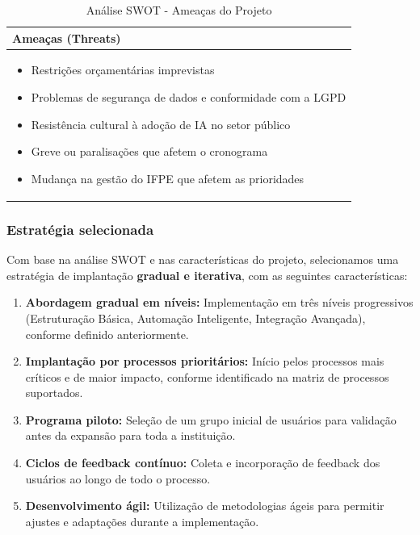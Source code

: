 \documentclass[12pt,a4paper]{article}
\begin{document}
\begin{table}[htbp]
\centering
\begin{tcolorbox}[enhanced, colback=yellow!5, colframe=yellow!40!black, arc=3mm, boxrule=0.5pt, width=0.85\textwidth]
\begin{tabular}{|p{12cm}|}
\hline
\rowcolor{yellow!10}\large \textbf{Ameaças (Threats)} \\
\hline
\begin{itemize}\setlength{\itemsep}{1pt}
\item Restrições orçamentárias imprevistas
\item Problemas de segurança de dados e conformidade com a LGPD
\item Resistência cultural à adoção de IA no setor público
\item Greve ou paralisações que afetem o cronograma
\item Mudança na gestão do IFPE que afetem as prioridades
\end{itemize} \\
\hline
\end{tabular}
\end{tcolorbox}
\caption{Análise SWOT - Ameaças do Projeto}
\end{table}
\subsubsection{Estratégia selecionada}

Com base na análise SWOT e nas características do projeto, selecionamos uma estratégia de implantação \textbf{gradual e iterativa}, com as seguintes características:

\begin{enumerate}
    \item \textbf{Abordagem gradual em níveis:} Implementação em três níveis progressivos (Estruturação Básica, Automação Inteligente, Integração Avançada), conforme definido anteriormente.
    
    \item \textbf{Implantação por processos prioritários:} Início pelos processos mais críticos e de maior impacto, conforme identificado na matriz de processos suportados.
    
    \item \textbf{Programa piloto:} Seleção de um grupo inicial de usuários para validação antes da expansão para toda a instituição.
    
    \item \textbf{Ciclos de feedback contínuo:} Coleta e incorporação de feedback dos usuários ao longo de todo o processo.
    
    \item \textbf{Desenvolvimento ágil:} Utilização de metodologias ágeis para permitir ajustes e adaptações durante a implementação.
\end{enumerate}
\end{document}
